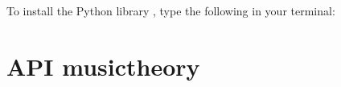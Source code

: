 \documentclass[letterpaper,10pt,english]{sphinxmanual}
\begin{document}
To install the Python library , type the following in your terminal:

\begin{sphinxVerbatim}[commandchars=\\\{\}]
  
\end{sphinxVerbatim}


\section{API \sphinxhyphen{} musictheory}
\label{\detokenize{api:module-musictheory}}\label{\detokenize{api:api-musictheory}}\label{\detokenize{api::doc}}
\end{document}
